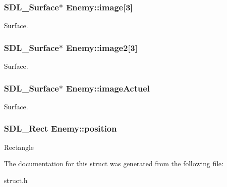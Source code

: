 \subsubsection[{\texorpdfstring{image}{image}}]{\setlength{\rightskip}{0pt plus 5cm}S\+D\+L\+\_\+\+Surface$\ast$ Enemy\+::image\mbox{[}3\mbox{]}}\hypertarget{structEnemy_afc1cf868e4b6602d2166ee9cfbf1d06e}{}\label{structEnemy_afc1cf868e4b6602d2166ee9cfbf1d06e}
Surface. 
\subsubsection[{\texorpdfstring{image2}{image2}}]{\setlength{\rightskip}{0pt plus 5cm}S\+D\+L\+\_\+\+Surface$\ast$ Enemy\+::image2\mbox{[}3\mbox{]}}\hypertarget{structEnemy_a43bdca7bc81657fccdb7d8cb7369f673}{}\label{structEnemy_a43bdca7bc81657fccdb7d8cb7369f673}
Surface. 
\subsubsection[{\texorpdfstring{image\+Actuel}{imageActuel}}]{\setlength{\rightskip}{0pt plus 5cm}S\+D\+L\+\_\+\+Surface$\ast$ Enemy\+::image\+Actuel}\hypertarget{structEnemy_ab8d7f9eceeef8f17331210f3f1fd2cf3}{}\label{structEnemy_ab8d7f9eceeef8f17331210f3f1fd2cf3}
Surface. 
\subsubsection[{\texorpdfstring{position}{position}}]{\setlength{\rightskip}{0pt plus 5cm}S\+D\+L\+\_\+\+Rect Enemy\+::position}\hypertarget{structEnemy_ac364f2ddf130c8622889deca0b6ba4d0}{}\label{structEnemy_ac364f2ddf130c8622889deca0b6ba4d0}
Rectangle 

The documentation for this struct was generated from the following file\+:\begin{DoxyCompactItemize}
\item 
struct.\+h\end{DoxyCompactItemize}
